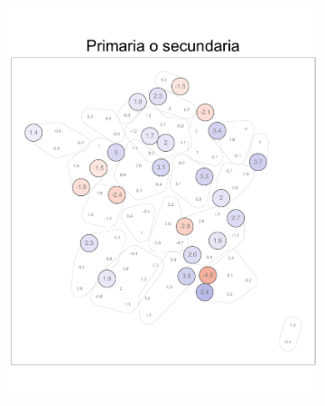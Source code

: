 \begin{figure}
\begin{subfigure}{0.275\textwidth}
	\includegraphics[width = \textwidth]{Figs/Efectos/Dorling_Efectos_Dip2_Modelo_H}
	\end{subfigure}
	~
	\begin{subfigure}{0.275\textwidth}

\end{subfigure}
\end{figure}
